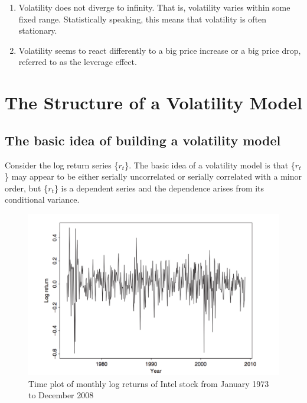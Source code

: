 \documentclass[a4paper,11pt]{article}
\begin{document}
\begin{enumerate}
\item Volatility does not diverge to infinity. That is, volatility varies
within some fixed range. Statistically speaking, this means that
volatility is often stationary.

\item Volatility seems to react differently to a big price increase or a
big price drop, referred to as the leverage effect.
\end{enumerate}


\section{The Structure of a Volatility Model}
\label{sec:orgd1118c3}

\subsection{The basic idea of building a volatility model}
\label{sec:org5c37adf}
Consider the log return series \{\(r_t\)\}. The basic idea of a volatility
model is that \{\(r_t\)\} may appear to be either serially uncorrelated or
serially correlated with a minor order, but \{\(r_t\)\} is a dependent
series and the dependence arises from its conditional variance. 

\begin{figure}[htbp]
\centering
\includegraphics[width=\textwidth]{img/intel.png}
\caption{\label{fig:orgd514d82}
Time plot of monthly log returns of Intel stock from January 1973 to December 2008}
\end{figure}
\end{document}
